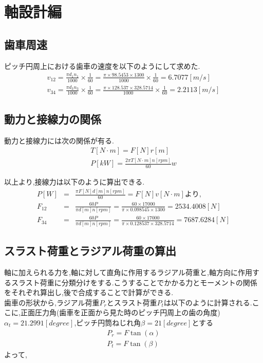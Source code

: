 \chapter{軸設計編}
\section{歯車周速}
ピッチ円周上における歯車の速度を以下のようにして求めた.
\begin{eqnarray}
v_{12}=\frac{\pi d_1 n_1}{1000} \times \frac{1}{60} = \frac{\pi \times 98.5453 \times 1300}{1000} \times \frac{1}{60} = 6.7077 [m/s]\\
v_{34}=\frac{\pi d_3 n_3}{1000} \times \frac{1}{60} = \frac{\pi \times 128.537 \times 328.5714}{1000} \times \frac{1}{60} = 2.2113 [m/s]
\end{eqnarray}

\section{動力と接線力の関係}
動力と接線力には次の関係が有る.
\begin{eqnarray}
T[N \cdot m]=F[N] r[m]\\
P[kW] = \frac{2\pi T[N \cdot m] n[rpm] }{60}w
\end{eqnarray}

以上より,接線力は以下のように算出できる.
\begin{eqnarray}
P[W] &=& \frac{\pi F[N] d[m] n[rpm] }{60}=F[N]v[N \cdot m]より,\nonumber\\
F_{12}&=& \frac{60P}{\pi d[m] n[rpm] } = \frac{60 \times 17000}{\pi \times 0.098545 \times  1300 } = 2534.4008[N]\\
F_{34}&=& \frac{60P}{\pi d[m] n[rpm] } = \frac{60 \times 17000}{\pi \times 0.128537 \times 328.5714} = 7687.6284[N]
\end{eqnarray}

\section{スラスト荷重とラジアル荷重の算出}
軸に加えられる力を,軸に対して直角に作用するラジアル荷重と,軸方向に作用するスラスト荷重に分類分けをする.こうすることでかかる力とモーメントの関係をそれぞれ算出し,後で合成することで計算ができる.\\
歯車の形状から,ラジアル荷重$P_r$とスラスト荷重$P_t$は以下のように計算される.ここに,正面圧力角(歯車を正面から見た時のピッチ円周上の歯の角度)$\alpha_t=21.2991[degree]$,ピッチ円筒ねじれ角$
\beta =21[degree]$とする\\
\begin{eqnarray}
P_r = F\tan(\alpha)\\
P_t = F\tan(\beta)
\end{eqnarray}
よって,

